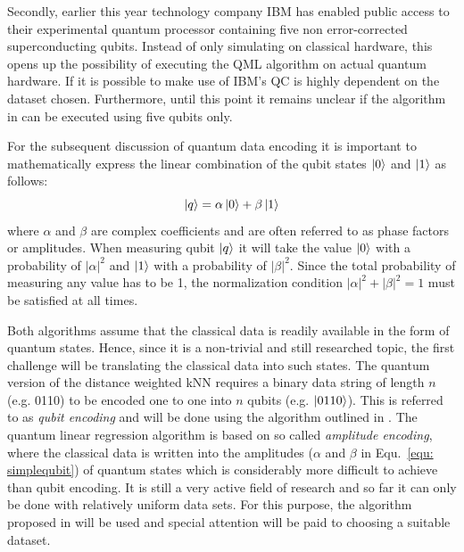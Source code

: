 \documentclass[a4paper]{article}
\newcommand*{\0}{$\ket{0}$}
\newcommand*{\1}{$\ket{1}$}
\begin{document}
Secondly, earlier this year technology company IBM has enabled public access to their experimental quantum processor containing five non error-corrected superconducting qubits. Instead of only simulating on classical hardware, this opens up the possibility of executing the QML algorithm on actual quantum hardware. If it is possible to make use of IBM's QC is highly dependent on the dataset chosen. Furthermore, until this point it remains unclear if the algorithm in \cite{Schuld2016} can be executed using five qubits only.

For the subsequent discussion of quantum data encoding it is important to mathematically express the linear combination of the qubit states \0 and \1 as follows:
\begin{equation}
\label{equ: simplequbit}
\ket{q} = \alpha \ket{0} + \beta \ket{1}
\end{equation}
where $\alpha$ and $\beta$ are complex coefficients and are often referred to as phase factors or amplitudes. When measuring qubit $\ket{q}$ it will take the value \0 with a probability of ${|\alpha|}^{2}$ and \1 with a probability of ${|\beta|}^{2}$. Since the total probability of measuring any value has to be 1, the normalization condition ${|\alpha|}^{2} + {|\beta|}^{2} =  1$ must be satisfied at all times.

Both algorithms assume that the classical data is readily available in the form of quantum states. Hence, since it is a non-trivial and still researched topic, the first challenge will be translating the classical data into such states. The quantum version of the distance weighted kNN requires a binary data string of length $n$ (e.g. 0110) to be encoded one to one into $n$ qubits (e.g. $\ket{0110}$). This is referred to as \textit{qubit encoding} and will be done using the algorithm outlined in \cite{ventura1999initializing}.
The quantum linear regression algorithm is based on so called \textit{amplitude encoding}, where the classical data is written into the amplitudes ($\alpha$ and $\beta$ in Equ.~\ref{equ: simplequbit}) of quantum states which is considerably more difficult to achieve than qubit encoding. It is still a very active field of research and so far it can only be done with relatively uniform data sets. For this purpose, the algorithm proposed in \cite{grover2002creating} will be used and special attention will be paid to choosing a suitable dataset.
\end{document}
